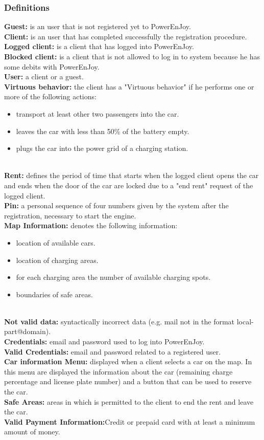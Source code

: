 \subsubsection{Definitions}
\textbf{Guest:}
 is an user that is not registered yet to PowerEnJoy.\\
\textbf{Client:}
is an user that has completed successfully the registration procedure.\\
\textbf{Logged client:}
is a client that has logged into PowerEnJoy.\\
\textbf{Blocked client:}
is a client that is not allowed to log in to system because he has some debits with PowerEnJoy.\\
\textbf{User:}
a client or a guest.\\
\textbf{Virtuous  behavior:}
the client has a "Virtuous behavior" if he performs one or more of the following actions: 
\begin{itemize}
\item transport at least other two passengers into the car.
\item leaves the car with less than 50\% of the battery empty.
\item plugs the car into the power grid of a charging station.
\end{itemize}
\emph{\\}
\textbf{Rent:} defines the period of time that starts when the logged client opens the car and ends when the door of the car are locked due to a "end rent" request of the logged client.\\
\textbf{Pin:} a personal sequence of four numbers given by the system after the registration, necessary to start the engine.\\
\textbf{Map Information:}
denotes the following information: 
\begin{itemize}
\item location of available cars.
\item location of charging areas.
\item for each charging area the number of available charging spots.
\item boundaries of safe areas.
\end{itemize}
\emph{\\}
\textbf{Not valid data:}
syntactically incorrect data (e.g. mail not in the format local-part@domain).\\
\textbf{Credentials:}
email and password used to log into PowerEnJoy.\\
\textbf{Valid Credentials:}
email and password related to a registered user.\\
\textbf{Car information Menu:}
displayed when a client selects a car on the map. In this menu are displayed the information about the car (remaining charge percentage and license plate number) and a button that can be used to reserve the car.\\
\textbf{Safe Areas:} 
areas in which is permitted to the client to end the rent and leave the car.\\
\textbf{Valid Payment Information:}Credit or prepaid card with at least a minimum amount of money.\\


